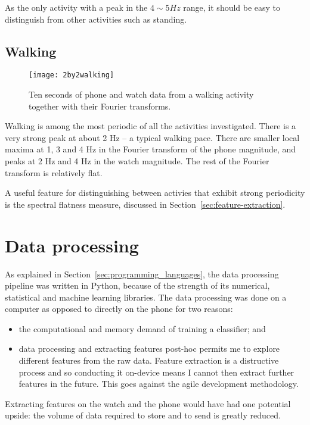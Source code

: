       As the only activity with a peak in the $4 \sim 5 \si{Hz}$ range, it should be easy to distinguish from other activities such as standing.
    \pagebreak[4]
    \subsection{Walking}
      \begin{figure}[!th]
        \centering
        \texttt{[image: 2by2walking]}
        \caption{Ten seconds of phone and watch data from a walking activity together with their Fourier transforms.}
        \label{fig:2by2walking}
      \end{figure}
      
      Walking is among the most periodic of all the activities investigated. There is a very strong peak at about 2 Hz -- a typical walking pace. There are smaller local maxima at 1, 3 and 4 Hz in the Fourier transform of the phone magnitude, and peaks at 2 Hz and 4 Hz in the watch magnitude. The rest of the Fourier transform is relatively flat.
      
      A useful feature for distinguishing between activies that exhibit strong periodicity is the spectral flatness measure, discussed in Section~\ref{sec:feature-extraction}.

  \section{Data processing}
    \label{sec:data-processing}
    As explained in Section~\ref{sec:programming_languages}, the data processing pipeline was written in Python, because of the strength of its numerical, statistical and machine learning libraries. The data processing was done on a computer as opposed to directly on the phone for two reasons:
    \begin{itemize}
      \item the computational and memory demand of training a classifier; and
      \item data processing and extracting features post-hoc permits me to explore different features from the raw data. Feature extraction is a distructive process and so conducting it on-device means I cannot then extract further features in the future. This goes against the agile development methodology.
    \end{itemize}
    
    Extracting features on the watch and the phone would have had one potential upside: the volume of data required to store and to send is greatly reduced. 
    
